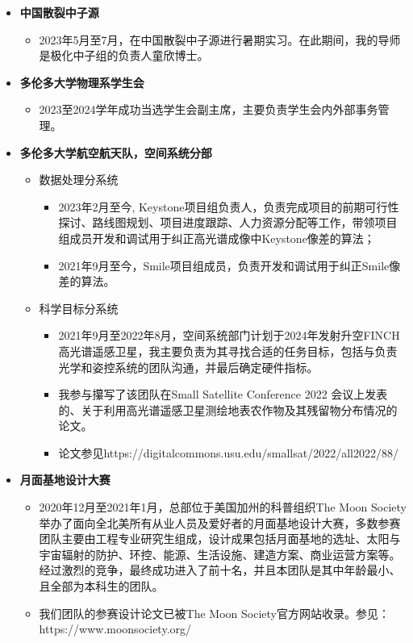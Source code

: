 \documentclass{article}
\begin{document}
\begin{itemize}

  \item \textbf{中国散裂中子源}
  \begin{itemize}
    \item 2023年5月至7月，在中国散裂中子源进行暑期实习。在此期间，我的导师是极化中子组的负责人童欣博士。
  \end{itemize}
  \item \textbf{多伦多大学物理系学生会}
  \begin{itemize}
    \item 2023至2024学年成功当选学生会副主席，主要负责学生会内外部事务管理。
  \end{itemize}
  \item \textbf{多伦多大学航空航天队，空间系统分部}
  \begin{itemize}
    \item 数据处理分系统
    \begin{itemize}
      \item 2023年2月至今, Keystone项目组负责人，负责完成项目的前期可行性探讨、路线图规划、项目进度跟踪、人力资源分配等工作，带领项目组成员开发和调试用于纠正高光谱成像中Keystone像差的算法；
      \item 2021年9月至今，Smile项目组成员，负责开发和调试用于纠正Smile像差的算法。
    \end{itemize}
    
    \item 科学目标分系统
    \begin{itemize}
      \item 2021年9月至2022年8月，空间系统部门计划于2024年发射升空FINCH高光谱遥感卫星，我主要负责为其寻找合适的任务目标，包括与负责光学和姿控系统的团队沟通，并最后确定硬件指标。
      \item 我参与攥写了该团队在Small Satellite Conference 2022 会议上发表的、关于利用高光谱遥感卫星测绘地表农作物及其残留物分布情况的论文。
      \item 论文参见https://digitalcommons.usu.edu/smallsat/2022/all2022/88/
    \end{itemize}
  
  \end{itemize}

  \item \textbf{月面基地设计大赛}
  \begin{itemize}
    \item 2020年12月至2021年1月，总部位于美国加州的科普组织The Moon Society举办了面向全北美所有从业人员及爱好者的月面基地设计大赛，多数参赛团队主要由工程专业研究生组成，设计成果包括月面基地的选址、太阳与宇宙辐射的防护、环控、能源、生活设施、建造方案、商业运营方案等。经过激烈的竞争，最终成功进入了前十名，并且本团队是其中年龄最小、且全部为本科生的团队。
    \item 我们团队的参赛设计论文已被The Moon Society官方网站收录。参见：https://www.moonsociety.org/
  \end{itemize}


\end{itemize}
\end{document}
